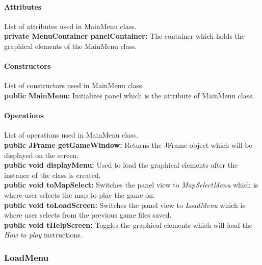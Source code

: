 \documentclass[12pt]{article} %
\begin{document}
\paragraph{Attributes \\}

List of attributes used in MainMenu class.\\
\textbf{private MenuContainer panelContainer:} The container which holds the graphical elements of the MainMenu class.

\paragraph{Constructors \\}
List of constructors used in MainMenu class.\\
\textbf{public MainMenu:} Initializes panel which is the attribute of MainMenu class.

\paragraph{Operations \\}
List of operations used in MainMenu class.\\
\textbf{public JFrame getGameWindow:} Returns the JFrame object which will be displayed on the screen.\\
\textbf{public void displayMenu:} Used to load the graphical elements after the instance of the class is created.\\
\textbf{public void toMapSelect:} Switches the panel view to \textit{MapSelectMenu} which is where user selects the map to play the game on.\\
\textbf{public void toLoadScreen:} Switches the panel view to \textit{LoadMenu} which is where user selects from the previous game files saved.\\
\textbf{public void tHelpScreen:} Toggles the graphical elements which will load the \textit{How to play} instructions.

\subsubsection{LoadMenu} %
\end{document}

